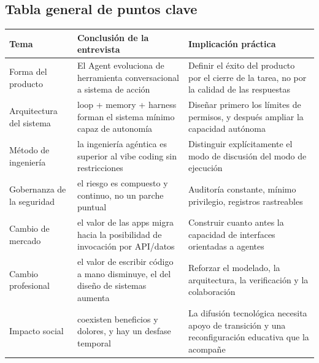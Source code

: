\documentclass[a4paper]{article}
\begin{document}
\subsection{Tabla general de puntos clave}
\begin{longtable}{p{}p{}p{}}
\toprule
\textbf{Tema} & \textbf{Conclusión de la entrevista} & \textbf{Implicación práctica} \\
\midrule
Forma del producto & El Agent evoluciona de herramienta conversacional a sistema de acción & Definir el éxito del producto por el cierre de la tarea, no por la calidad de las respuestas \\
\midrule
Arquitectura del sistema & loop + memory + harness forman el sistema mínimo capaz de autonomía & Diseñar primero los límites de permisos, y después ampliar la capacidad autónoma \\
\midrule
Método de ingeniería & la ingeniería agéntica es superior al vibe coding sin restricciones & Distinguir explícitamente el modo de discusión del modo de ejecución \\
\midrule
Gobernanza de la seguridad & el riesgo es compuesto y continuo, no un parche puntual & Auditoría constante, mínimo privilegio, registros rastreables \\
\midrule
Cambio de mercado & el valor de las apps migra hacia la posibilidad de invocación por API/datos & Construir cuanto antes la capacidad de interfaces orientadas a agentes \\
\midrule
Cambio profesional & el valor de escribir código a mano disminuye, el del diseño de sistemas aumenta & Reforzar el modelado, la arquitectura, la verificación y la colaboración \\
\midrule
Impacto social & coexisten beneficios y dolores, y hay un desfase temporal & La difusión tecnológica necesita apoyo de transición y una reconfiguración educativa que la acompañe \\
\bottomrule
\end{longtable}
\end{document}
